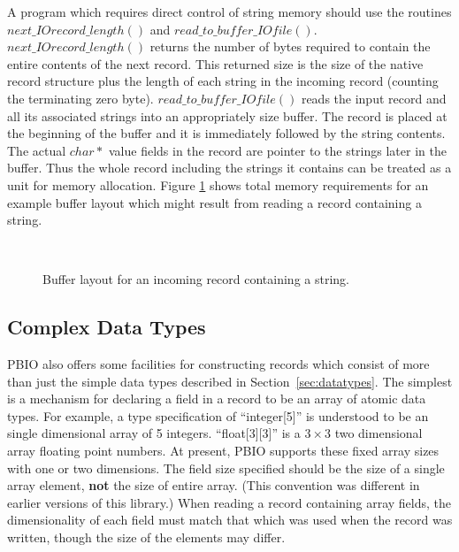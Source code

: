 \documentclass{article}
\begin{document}
A program which requires direct control of string memory should use the
routines $next\_IOrecord\_length()$ and $read\_to\_buffer\_IOfile()$.
$next\_IOrecord\_length()$ returns the number of bytes required to contain the
entire contents of the next record.  This returned size is the size of the
native record structure plus the length of each string in the incoming record
(counting the terminating zero byte).  
$read\_to\_buffer\_IOfile()$ reads the input record and all its associated
strings into an appropriately size buffer.  The record is placed at the
beginning of the buffer and it is immediately followed by the string contents.
The actual $char*$ value fields in the record are pointer to the strings
later in the buffer.  Thus the whole record including the strings it contains
can be treated as a unit for memory allocation.  Figure \ref{string_mem} shows
total memory requirements for an example buffer layout which might result from
reading a record containing a string.
\begin{figure}[b]
\begin{center}\
\caption{Buffer layout for an incoming record containing a
string.\label{string_mem}} 
\end{center}
\end{figure}

\subsection{Complex Data Types}

PBIO also offers some facilities for constructing records which consist of
more than just the simple data types described in Section~\ref{sec:datatypes}.
The simplest is a mechanism for declaring a field in a record to be an array
of atomic data types.  For example, a type specification of ``integer[5]'' is
understood to be an single dimensional array of 5 integers.  ``float[3][3]''
is a $3\times 3$ two dimensional array floating point numbers.  At present,
PBIO supports these fixed array sizes with one or two dimensions.  The field
size specified should be the size of a single array element, {\bf not} the
size of entire array.  (This convention was different in earlier versions of
this library.)  When reading a record containing array fields, the
dimensionality of each field must match that which was used when the record
was written, though the size of the elements may differ.
\end{document}

